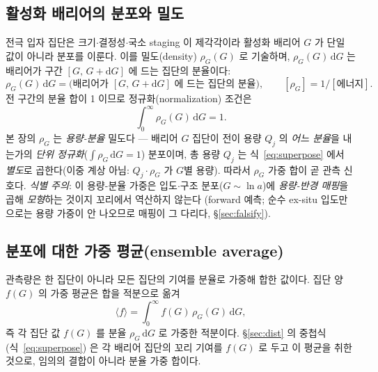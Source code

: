 \documentclass[11pt,a4paper]{article}
\newcommand{\dd}{\mathrm{d}}
\begin{document}
\subsection{활성화 배리어의 분포와 밀도}
전극 입자 집단은 크기$\cdot$결정성$\cdot$국소 staging 이 제각각이라 활성화 배리어 $G$ 가 단일 값이 아니라 분포를
이룬다. 이를 밀도(density) $\rho_G(G)$ 로 기술하며, $\rho_G(G)\,\dd G$ 는 배리어가 구간 $[G,\,G+\dd G]$ 에 드는
집단의 분율이다:
\begin{equation}
\rho_G(G)\,\dd G=\big(\text{배리어가 }[G,\,G+\dd G]\text{ 에 드는 집단의 분율}\big),\qquad [\rho_G]=1/[\text{에너지}].
\label{eq:density}
\end{equation}
전 구간의 분율 합이 1 이므로 정규화(normalization) 조건은
\begin{equation}
\int_0^\infty\rho_G(G)\,\dd G=1.
\label{eq:norm}
\end{equation}
본 장의 $\rho_G$ 는 \emph{용량-분율} 밀도다 — 배리어 $G$ 집단이 전이 용량 $Q_j$ 의 \emph{어느 분율}을 내는가의 \emph{단위
정규화}($\int\rho_G\,\dd G=1$) 분포이며, 총 용량 $Q_j$ 는 식~\eqref{eq:superpose} 에서 \emph{별도}로 곱한다(이중 계상
아님: $Q_j\!\cdot\!\rho_G$ 가 $G$별 용량). 따라서 $\rho_G$ 가중 합이 곧 관측 신호다. \emph{식별 주의}: 이 용량-분율 가중은
입도$\cdot$구조 분포($G\!\sim\!\ln a$)에 \emph{용량-반경 매핑}을 곱해 \emph{모형}하는 것이지 꼬리에서 역산하지 않는다
(forward 예측; 순수 ex-situ 입도만으로는 용량 가중이 안 나오므로 매핑이 그 다리다, \S\ref{sec:falsify}).

\subsection{분포에 대한 가중 평균(ensemble average)}
관측량은 한 집단이 아니라 모든 집단의 기여를 분율로 가중해 합한 값이다. 집단 양 $f(G)$ 의 가중 평균은 합을
적분으로 옮겨
\begin{equation}
\langle f\rangle=\int_0^\infty f(G)\,\rho_G(G)\,\dd G,
\label{eq:wavg}
\end{equation}
즉 각 집단 값 $f(G)$ 를 분율 $\rho_G\,\dd G$ 로 가중한 적분이다. \S\ref{sec:dist} 의 중첩식(식~\eqref{eq:superpose})
은 각 배리어 집단의 꼬리 기여를 $f(G)$ 로 두고 이 평균을 취한 것으로, 임의의 결합이 아니라 분율 가중 합이다.
\end{document}
